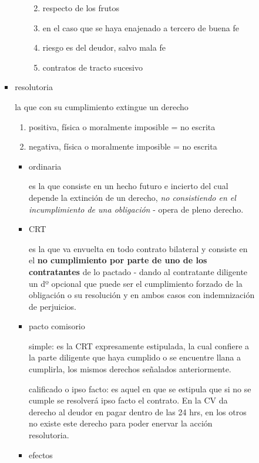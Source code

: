 \documentclass[]{article}
\providecommand{\tightlist}{%
  \setlength{\itemsep}{0pt}\setlength{\parskip}{0pt}}
\begin{document}
\begin{itemize}
\begin{itemize}
\begin{itemize}
\begin{itemize}
\begin{itemize}
          \begin{enumerate}
          \def\labelenumi{\arabic{enumi}.}
          \tightlist
          \item
            respecto de los frutos
          \item
            en el caso que se haya enajenado a tercero de buena fe
          \item
            riesgo es del deudor, salvo mala fe
          \item
            contratos de tracto sucesivo
          \end{enumerate}
        \end{itemize}
      \item
        resolutoria

        la que con su cumplimiento extingue un derecho

        \begin{enumerate}
        \def\labelenumi{\arabic{enumi}.}
        \tightlist
        \item
          positiva, física o moralmente imposible = no escrita
        \item
          negativa, física o moralmente imposible = no escrita
        \end{enumerate}

        \begin{itemize}
        \item
          ordinaria

          es la que consiste en un hecho futuro e incierto del cual
          depende la extinción de un derecho, \emph{no consistiendo en
          el incumplimiento de una obligación} - opera de pleno derecho.
        \item
          CRT

          es la que va envuelta en todo contrato bilateral y consiste en
          el \textbf{no cumplimiento por parte de uno de los
          contratantes} de lo pactado - dando al contratante diligente
          un dº opcional que puede ser el cumplimiento forzado de la
          obligación o su resolución y en ambos casos con indemnización
          de perjuicios.
        \item
          pacto comisorio

          simple: es la CRT expresamente estipulada, la cual confiere a
          la parte diligente que haya cumplido o se encuentre llana a
          cumplirla, los mismos derechos señalados anteriormente.

          calificado o ipso facto: es aquel en que se estipula que si no
          se cumple se resolverá ipso facto el contrato. En la CV da
          derecho al deudor en pagar dentro de las 24 hrs, en los otros
          no existe este derecho para poder enervar la acción
          resolutoria.
        \item
          efectos


\end{itemize}
\end{itemize}
\end{itemize}
\end{itemize}
\end{itemize}
\end{document}
